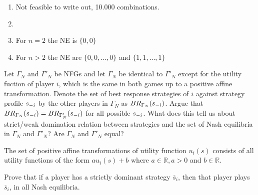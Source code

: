 \documentclass[../main.tex]{subfiles}
\begin{document}
\begin{solution}
	\begin{enumerate}
		\item Not feasible to write out, 10.000 combinations.
		\item 
		\item For $n=2$ the NE is $\{0,0\}$
		\item For $n>2$ the NE are $\{0,0,\dots,0\}$ and $\{1,1,\dots,1\}$
	\end{enumerate}
\end{solution}

\begin{question}
Let $\Gamma_N$ and $\Gamma'_N$ be NFGs and let $\Gamma_N$  be identical to $\Gamma'_N$ except for the utility fuction of player $i$, which is the same in both games up to a positive affine transformation.
Denote the set of best response strategies of $i$ against strategy profile $s_{\--i}$ by the other players in $\Gamma_N$  as $BR_{\Gamma_N}(s_{\--i})$.
Argue that $BR_{\Gamma_N}(s_{\--i}) = BR_{\Gamma'_N}(s_{\--i})$ for all possible $s_{\--i}$.
What does this tell us about strict/weak domination relation between strategies and the set of Nash equilibria in $\Gamma_N$ and $\Gamma'_N$? Are $\Gamma_N$ and $\Gamma'_N$ equal?

The set of positive affine transformations of utility function $u_i(s)$ consists of all utility functions of the form $au_i(s) + b$ where $a \in \mathbb{R}, a > 0$ and $b \in \mathbb{R}$.
\end{question}

\begin{solution}

\end{solution}

\begin{question}
	Prove that if a player has a strictly dominant strategy $\overline{s}_i$, then that player plays $\overline{s}_i$, in all Nash equilibria. 
\end{question}
\end{document}
